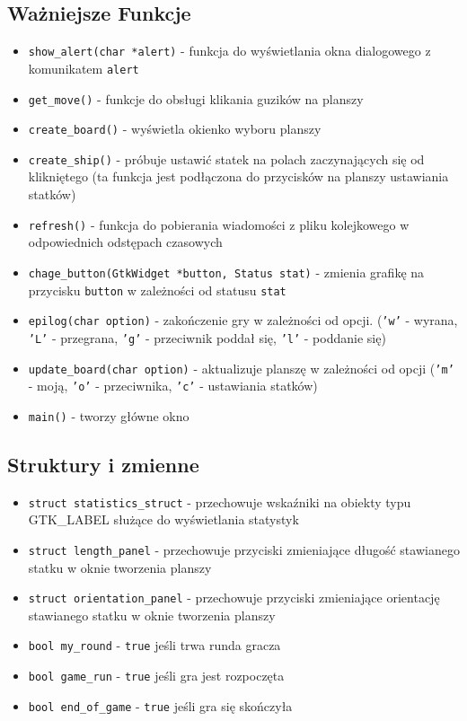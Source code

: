 \documentclass[a4paper]{article}
\begin{document}
\subsection{Ważniejsze Funkcje}
\begin{itemize}
    \item \texttt{show\_alert(char *alert)} - funkcja do wyświetlania okna dialogowego z komunikatem \texttt{alert}
    \item \texttt{get\_move()} - funkcje do obsługi klikania guzików na planszy
    \item \texttt{create\_board()} - wyświetla okienko wyboru planszy
    \item \texttt{create\_ship()} - próbuje ustawić statek na polach zaczynających się od klikniętego
(ta funkcja jest podłączona do przycisków na planszy ustawiania statków)
    \item \texttt{refresh()} - funkcja do pobierania wiadomości z pliku kolejkowego w odpowiednich odstępach czasowych
    \item \texttt{chage\_button(GtkWidget *button, Status stat)} - zmienia grafikę na przycisku \texttt{button}
w zależności od statusu \texttt{stat}
    \item \texttt{epilog(char option)} - zakończenie gry w zależności od opcji. (\texttt{'w'} - wyrana, \texttt{'L'} - przegrana,
\texttt{'g'} - przeciwnik poddał się, \texttt{'l'} - poddanie się)
    \item \texttt{update\_board(char option)} - aktualizuje planszę w zależności od opcji (\texttt{'m'} - moją,
\texttt{'o'} - przeciwnika, \texttt{'c'} - ustawiania statków)
    \item \texttt{main()} - tworzy główne okno
\end{itemize}

\subsection{Struktury i zmienne}
\begin{itemize}
    \item \texttt{struct statistics\_struct} - przechowuje wskaźniki na obiekty typu GTK\_LABEL służące
do wyświetlania statystyk
    \item \texttt{struct length\_panel} - przechowuje przyciski zmieniające długość stawianego statku
w oknie tworzenia planszy
    \item \texttt{struct orientation\_panel} - przechowuje przyciski zmieniające orientację stawianego
statku w oknie tworzenia planszy
    \item \texttt{bool my\_round} - \texttt{true} jeśli trwa runda gracza
    \item \texttt{bool game\_run} - \texttt{true} jeśli gra jest rozpoczęta
    \item \texttt{bool end\_of\_game} - \texttt{true} jeśli gra się skończyła
\end{itemize}   
\end{document}
